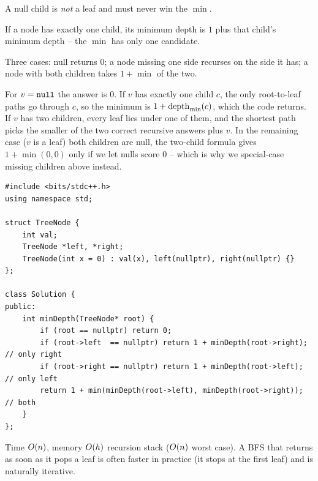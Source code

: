 \begin{observation}
A null child is \emph{not} a leaf and must never win the $\min$.
\end{observation}
\begin{observation}
If a node has exactly one child, its minimum depth is $1$ plus that child's minimum
depth -- the $\min$ has only one candidate.
\end{observation}

Three cases: null returns $0$; a node missing one side recurses on the side it has; a node
with both children takes $1+\min$ of the two.

\begin{proofbox}
For $v=\texttt{null}$ the answer is $0$. If $v$ has exactly one child $c$, the only root-to-leaf
paths go through $c$, so the minimum is $1+\operatorname{depth}_{\min}(c)$, which the code returns. If $v$
has two children, every leaf lies under one of them, and the shortest path picks the
smaller of the two correct recursive answers plus $v$. In the remaining case ($v$ is a
leaf) both children are null, the two-child formula gives $1+\min(0,0)$ only if we let
nulls score $0$ -- which is why we special-case missing children above instead.
\end{proofbox}

\begin{lstlisting}[caption={Minimum Depth (LeetCode 111)}, label={lst:c01-min-depth-soln}]
#include <bits/stdc++.h>
using namespace std;

struct TreeNode {
    int val;
    TreeNode *left, *right;
    TreeNode(int x = 0) : val(x), left(nullptr), right(nullptr) {}
};

class Solution {
public:
    int minDepth(TreeNode* root) {
        if (root == nullptr) return 0;
        if (root->left  == nullptr) return 1 + minDepth(root->right);  // only right
        if (root->right == nullptr) return 1 + minDepth(root->left);   // only left
        return 1 + min(minDepth(root->left), minDepth(root->right));   // both
    }
};
\end{lstlisting}

\begin{complexitybox}
Time $O(n)$, memory $O(h)$ recursion stack ($O(n)$ worst case). A BFS that
returns as soon as it pops a leaf is often faster in practice (it stops at the first leaf)
and is naturally iterative.
\end{complexitybox}

